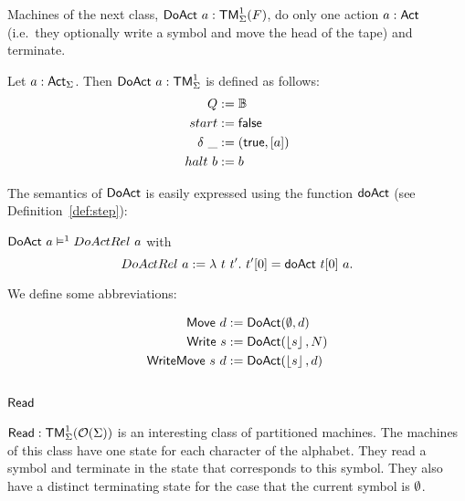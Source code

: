 Machines of the next class, $\mathsf{DoAct}~a : \mathsf{TM}_\Sigma^1(F)$, do only one action $a:\mathsf{Act}$ (i.e.\ they optionally write a symbol and move the head of
the tape) and terminate.
\begin{definition}[$\MS{DoAct}~a$][DoAct]
  \label{def:DoAct}
  Let $a:\mathsf{Act}_\Sigma$.  Then $\mathsf{DoAct}~a : \mathsf{TM}_\Sigma^1$ is defined as follows:
  \begin{align*}
    Q          &:= \mathbb{B} \\
    start      &:= \mathsf{false} \\
    \delta ~\_ &:= (\mathsf{true}, \left[ a \right]) \\
    halt   ~ b &:= b
  \end{align*}
\end{definition}
The semantics of $\mathsf{DoAct}$ is easily expressed using the function $\mathsf{doAct}$ (see Definition~\ref{def:step}):
\begin{lemma}
  \label{lem:DoAct_Sem} $\mathsf{DoAct}~a \mathrel{\vDash^{1}} DoActRel~a$ with
  \[
    DoActRel~a := \lambda~t~t'.~ t'[0] = \mathsf{doAct}~t[0]~a.
  \]
\end{lemma}
We define some abbreviations:
\begin{definition}
 \label{def:DoAct-derived} 
 \begin{align*}
   \mathsf{Move}       ~d &:= \mathsf{DoAct} (\emptyset, d) \\
   \mathsf{Write}    ~s   &:= \mathsf{DoAct} (\left\lfloor {s} \right\rfloor, N) \\
   \mathsf{WriteMove}~s~d &:= \mathsf{DoAct} (\left\lfloor {s} \right\rfloor, d)
 \end{align*}
\end{definition}


\subsection{$\mathsf{Read}$}
\label{sec:basic_machines-Read}

$\mathsf{Read} : \mathsf{TM}_\Sigma^1(\mathcal{O}(\Sigma))$ is an interesting class of partitioned machines.  The machines of this class have one state for each
character of the alphabet.  They read a symbol and terminate in the state that corresponds to this symbol.  They also have a distinct terminating
state for the case that the current symbol is $\emptyset$.

